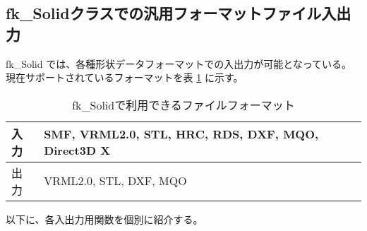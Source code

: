 \subsection{fk\_Solidクラスでの汎用フォーマットファイル入出力}
fk\_Solid では、各種形状データフォーマットでの入出力が可能となっている。
現在サポートされているフォーマットを表 \ref{tbl:SolidFileIO} に示す。

\begin{table}[H]
\caption{fk\_Solidで利用できるファイルフォーマット}
\label{tbl:SolidFileIO}
\begin{center}
\begin{tabular}{|l|l|}
\hline
入力 & SMF, VRML2.0, STL, HRC, RDS, DXF, MQO, Direct3D X \\ \hline
出力 & VRML2.0, STL, DXF, MQO \\ \hline
\end{tabular}
\end{center}
\end{table}
以下に、各入出力用関数を個別に紹介する。
